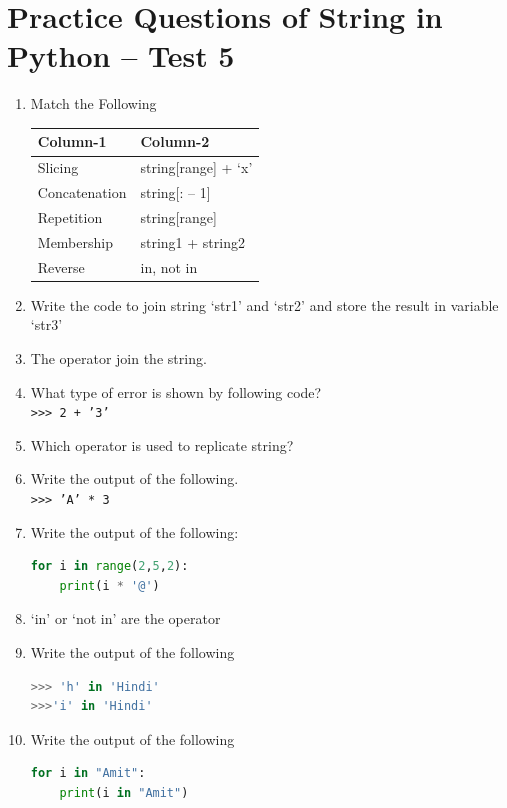 \documentclass[12pt,a4paper]{article}
\begin{document}
\section{Practice Questions of String in Python -- Test 5}

\begin{enumerate}[label=\textbf{Q\arabic*.}]

\item Match the Following

\begin{center}
\begin{tabular}{|l|l|}
\hline
\textbf{Column-1} & \textbf{Column-2} \\
\hline
Slicing & string[range] + `x' \\
Concatenation & string[: -- 1] \\
Repetition & string[range] \\
Membership & string1 + string2 \\
Reverse & in, not in \\
\hline
\end{tabular}
\end{center}

\item Write the code to join string `str1' and `str2' and store the result in variable `str3'

\item The \underline{\hspace{3cm}} operator join the string.

\item What type of error is shown by following code? \\
\texttt{>>> 2 + '3'}

\item Which operator is used to replicate string?

\item Write the output of the following. \\
\texttt{>>> 'A' * 3}

\item Write the output of the following:
\begin{lstlisting}[language=Python]
for i in range(2,5,2):
    print(i * '@')
\end{lstlisting}

\item `in' or `not in' are the \underline{\hspace{3cm}} operator

\item Write the output of the following
\begin{lstlisting}[language=Python]
>>> 'h' in 'Hindi'
>>>'i' in 'Hindi'
\end{lstlisting}

\item Write the output of the following
\begin{lstlisting}[language=Python]
for i in "Amit":
    print(i in "Amit")
\end{lstlisting}

\end{enumerate}
\end{document}
